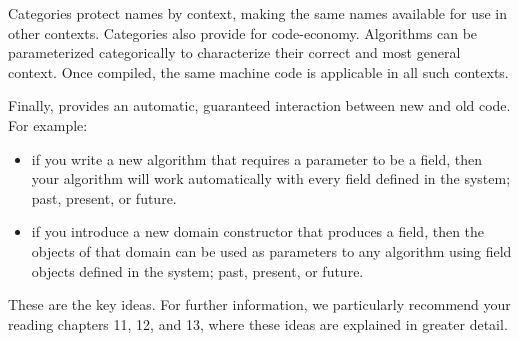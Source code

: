 Categories protect names by context,
making the same names available for use in other contexts.
Categories also provide for code-economy.
Algorithms can be parameterized categorically
to characterize their correct and most general context.
Once compiled, the same machine code is applicable
in all such contexts.

Finally, \Language{} provides an automatic, guaranteed interaction between
new and old code.
For example:
\begin{itemize}
\item if you write a new algorithm that requires a parameter to be a
field, then your algorithm will work automatically with every field
defined in the system; past, present, or future.
\item if you introduce a new domain constructor that produces a field,
then the objects of that domain can be used as parameters to any algorithm
using field objects defined in the system; past, present, or future.
\end{itemize}

These are the key ideas.
For further information, we particularly recommend your reading
chapters 11, 12, and 13, where these ideas are explained
in greater detail.

